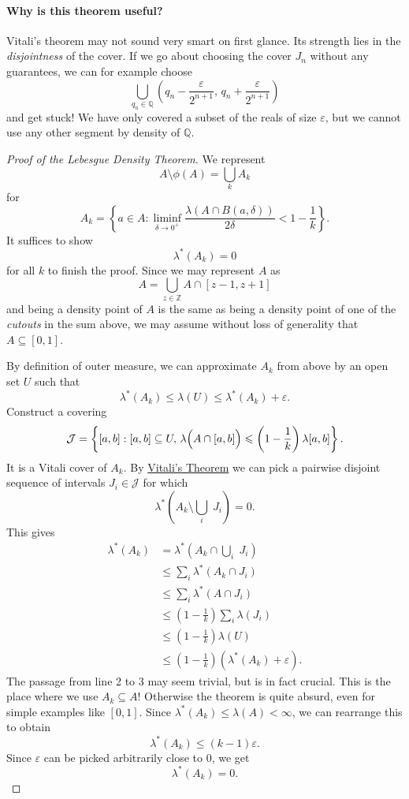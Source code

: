 \paragraph{Why is this theorem useful?} Vitali's theorem may not sound very smart on first glance. Its strength lies in the \emph{disjointness} of the cover. If we go about choosing the cover \( J_n \) without any guarantees, we can for example choose
\[ 
    \bigcup_{q_n \in \mathbb{Q}} \left(q_n - \frac{\varepsilon}{2^{n+1}},\,q_n + \frac{\varepsilon }{2^{n+1}}\right) 
\]
and get stuck! We have only covered a subset of the reals of size \(\varepsilon \), but we cannot use any other segment by density of \( \mathbb{Q} \).
\begin{proof}[Proof of the Lebesgue Density Theorem]
    We represent
    \[ 
    A \setminus \phi(A) = \bigcup_k A_k      
   \]
   for
   \[ 
       A_k = \left\{ a \in A : \liminf_{\delta \to 0^+} \frac{\lambda(A \cap B(a,\delta))}{2\delta} < 1 - \frac{1}{k} \right\}.
  \]
  It suffices to show
  \[ 
     \lambda^*(A_k) = 0 
 \]
 for all \( k \) to finish the proof. Since we may represent \( A \) as
 \[ 
     A = \bigcup_{z \in \mathbb{Z}} A \cap [z-1, z+1] 
\]
and being a density point of \( A \) is the same as being a density point of one of the \emph{cutouts} in the sum above, we may assume without loss of generality that \( A \subseteq [0,1] \).

By definition of outer measure, we can approximate \( A_k \) from above by an open set \( U \) such that
\[ 
    \lambda^*(A_k) \leqslant \lambda(U) \leqslant \lambda^*(A_k) + \varepsilon.
\]
Construct a covering
\[ 
    \mathcal{J} = \left\{ [a,b] : [a,b] \subseteq U,\,\lambda\Bigl(A \cap [a,b]\Bigr) \leqslant \left(1 - \frac{1}{k}\right)\lambda[a,b]\right\}.
\]
It is a Vitali cover of \( A_k \). By \hyperlink{VitaliCoveringTheorem}{Vitali's Theorem} we can pick a pairwise disjoint sequence of intervals \( J_i \in \mathcal{J}\) for which
\[ 
    \lambda^*\left( A_k \setminus \bigcup_i\; J_i\right) = 0.
\]
This gives
\begin{align*}
    \lambda^* (A_k) &=\lambda^*\left(A_k \cap \bigcup_i \; J_i \right) \\
                    &\leqslant \sum_i \lambda^*(A_k \cap J_i ) \\
                    &\leqslant \sum_i \lambda^*(A \cap J_i ) \\
                    &\leqslant \left( 1 - \frac{1}{k} \right) \sum_i\lambda(J_i) \\
                    &\leqslant \left( 1 - \frac{1}{k} \right)\lambda(U) \\
                    &\leqslant \left( 1 - \frac{1}{k} \right) \left(\lambda^*(A_k) +\varepsilon \right).
\end{align*}
The passage from line 2 to 3 may seem trivial, but is in fact crucial. This is the place where we use \( A_k \subseteq A \)! Otherwise the theorem is quite absurd, even for simple examples like \( [0,1] \). Since \( \lambda^*(A_k) \leqslant\lambda(A) < \infty \), we can rearrange this to obtain
\[ 
   \lambda^*(A_k) \leqslant (k-1)\varepsilon. 
\]
Since \(\varepsilon \) can be picked arbitrarily close to 0, we get
\[ 
   \lambda^*(A_k) = 0. 
\]


\end{proof}
